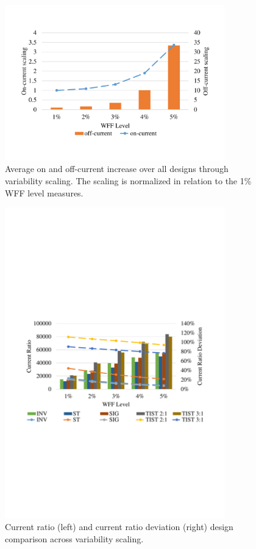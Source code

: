 \documentclass[pgmicro,diss,english]{iiufrgs}
\begin{document}
    \begin{figure}[h]
        \centering
            \includegraphics[width=0.85\textwidth, trim={1.25cm 3cm 2cm 3cm}, clip]{on-off-scaling2.pdf}
            \caption{Average on and off-current increase over all designs through variability scaling. The scaling is normalized in relation to the 1\% WFF level measures.}
        \label{figOnOffScal}
    \end{figure}

    \begin{figure}[H]
        \centering
            \includegraphics[width=0.85\textwidth, trim={1.25cm 9cm 2cm 10cm}, clip]{currRatioWFF.pdf}
            \caption{Current ratio (left) and current ratio deviation (right) design comparison across variability scaling.}
        \label{figsCurrComp}
    \end{figure}
\end{document}
